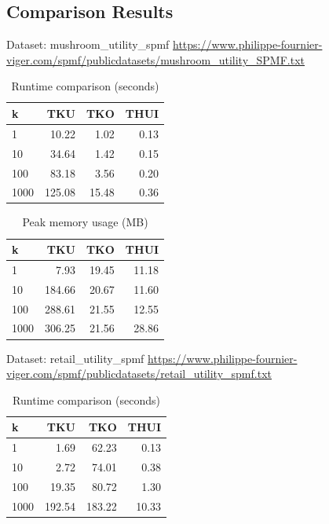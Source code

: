 \subsection{Comparison Results}
Dataset: mushroom\_utility\_spmf
\url{https://www.philippe-fournier-viger.com/spmf/publicdatasets/mushroom_utility_SPMF.txt}

\begin{table}[H]
\caption{Runtime comparison (seconds)}\label{tab:runtime}
\centering
\begin{tabular}{@{}lrrr@{}}
\toprule
\textbf{k} & \textbf{TKU} & \textbf{TKO} & \textbf{THUI} \\
\midrule
1 & 10.22 & 1.02 & 0.13 \\
10 & 34.64 & 1.42 & 0.15 \\
100 & 83.18 & 3.56 & 0.20 \\
1000 & 125.08 & 15.48 & 0.36 \\
\bottomrule
\end{tabular}
\end{table}

\begin{table}[H]
\caption{Peak memory usage (MB)}\label{tab:memory}
\centering
\begin{tabular}{@{}lrrr@{}}
\toprule
\textbf{k} & \textbf{TKU} & \textbf{TKO} & \textbf{THUI} \\
\midrule
1 & 7.93 & 19.45 & 11.18 \\
10 & 184.66 & 20.67 & 11.60 \\
100 & 288.61 & 21.55 & 12.55 \\
1000 & 306.25 & 21.56 & 28.86 \\

\bottomrule
\end{tabular}
\end{table}

Dataset: retail\_utility\_spmf
\url{https://www.philippe-fournier-viger.com/spmf/publicdatasets/retail_utility_spmf.txt}

\begin{table}[H]
\caption{Runtime comparison (seconds)}\label{tab:runtime}
\centering
\begin{tabular}{@{}lrrr@{}}
\toprule
\textbf{k} & \textbf{TKU} & \textbf{TKO} & \textbf{THUI} \\
\midrule
1 & 1.69 & 62.23 & 0.13 \\
10 & 2.72 & 74.01 & 0.38 \\
100 & 19.35 & 80.72 & 1.30 \\
1000 & 192.54 & 183.22 & 10.33 \\
\bottomrule
\end{tabular}
\end{table}

